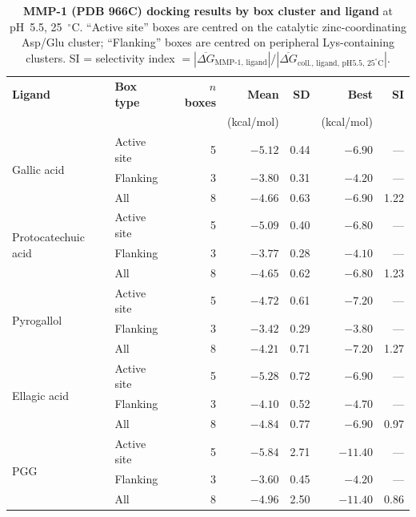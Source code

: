 \documentclass[11pt]{article}
\begin{document}
\begin{table}[H]
\small
\centering
\caption{\textbf{MMP-1 (PDB 966C) docking results by box cluster and ligand}
  at pH~5.5, 25~$^\circ$C.
  ``Active site'' boxes are centred on the catalytic zinc-coordinating Asp/Glu
  cluster; ``Flanking'' boxes are centred on peripheral Lys-containing
  clusters.
  SI = selectivity index $= |\overline{\Delta G}_\mathrm{MMP\text{-}1,\,ligand}|
  / |\overline{\Delta G}_\mathrm{coll.,\,ligand,\,pH5.5,\,25^{\circ}C}|$.}
\label{tab:si_mmp1}
\begin{tabular}{llrrrrr}
\toprule
\textbf{Ligand} & \textbf{Box type}
  & \textbf{$n$ boxes} & \textbf{Mean} & \textbf{SD}
  & \textbf{Best} & \textbf{SI} \\
 & & & (kcal/mol) & & (kcal/mol) & \\
\midrule
\multirow{3}{*}{Gallic acid}
  & Active site & 5 & $-5.12$ & 0.44 & $-6.90$ & --- \\
  & Flanking    & 3 & $-3.80$ & 0.31 & $-4.20$ & --- \\
  & All         & 8 & $-4.66$ & 0.63 & $-6.90$ & 1.22 \\
\midrule
\multirow{3}{*}{Protocatechuic acid}
  & Active site & 5 & $-5.09$ & 0.40 & $-6.80$ & --- \\
  & Flanking    & 3 & $-3.77$ & 0.28 & $-4.10$ & --- \\
  & All         & 8 & $-4.65$ & 0.62 & $-6.80$ & 1.23 \\
\midrule
\multirow{3}{*}{Pyrogallol}
  & Active site & 5 & $-4.72$ & 0.61 & $-7.20$ & --- \\
  & Flanking    & 3 & $-3.42$ & 0.29 & $-3.80$ & --- \\
  & All         & 8 & $-4.21$ & 0.71 & $-7.20$ & 1.27 \\
\midrule
\multirow{3}{*}{Ellagic acid}
  & Active site & 5 & $-5.28$ & 0.72 & $-6.90$ & --- \\
  & Flanking    & 3 & $-4.10$ & 0.52 & $-4.70$ & --- \\
  & All         & 8 & $-4.84$ & 0.77 & $-6.90$ & 0.97 \\
\midrule
\multirow{3}{*}{PGG}
  & Active site & 5 & $-5.84$ & 2.71 & $-11.40$& --- \\
  & Flanking    & 3 & $-3.60$ & 0.45 & $-4.20$ & --- \\
  & All         & 8 & $-4.96$ & 2.50 & $-11.40$& 0.86 \\
\bottomrule
\end{tabular}
\end{table}
\end{document}
